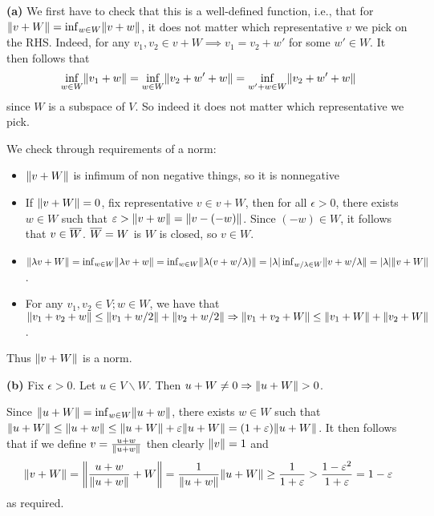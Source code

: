 \documentclass[a4paper, 10pt]{article}
\begin{document}
\begin{solution}
    \textbf{(a)} We first have to check that this is a well-defined function, i.e., that for $\norm{v + W} = \inf_{w \in W} \norm{v + w}$, it does not matter which representative $v$ we pick on the RHS. Indeed, for any $v_1, v_2 \in v + W \implies v_1 = v_2 + w'$ for some $w' \in W$. It then follows that \begin{equation*}
    \inf_{w \in W} \norm{v_1 + w} = \inf_{w \in W} \norm{v_2 + w' + w} = \inf_{w' + w \in W} \norm{v_2 + w' + w}
    \end{equation*}
    since $W$ is a subspace of $V$. So indeed it does not matter which representative we pick.


    We check through requirements of a norm:
    \begin{itemize}
        \item $\norm{v + W}$ is infimum of non negative things, so it is nonnegative
        \item If $\norm{v + W} = 0$, fix representative $v \in v + W$, then for all $\epsilon > 0$, there exists $w \in W$ such that $\epsilon > \norm{v + w} = \norm{v - (-w)}$. Since $(-w) \in W$, it follows that $v \in \cl{W}$. $\cl{W} = W$ is $W$ is closed, so $v \in W$.
        \item $\norm{\lambda v + W} = \inf_{w \in W} \norm{\lambda v + w} = \inf_{w \in W} \norm{\lambda(v + w/\lambda)} = \abs{\lambda} \inf_{w/\lambda \in W} \norm{v + w/\lambda} = \abs{\lambda} \norm{v + W}$.
        \item For any $v_1, v_2 \in V; w \in W$, we have that  $\norm{v_1 + v_2+ w} \leq \norm{v_1 + w/2} + \norm{v_2 + w/2} \implies \norm{v_1 + v_2 + W} \leq \norm{v_1 + W} + \norm{v_2 + W}$.
    \end{itemize}
    Thus $\norm{v + W}$ is a norm.

    \textbf{(b)} Fix $\epsilon > 0$. Let $u \in V \backslash W$. Then $u + W \neq 0 \implies \norm{u + W} > 0$.

    Since $\norm{u + W} = \inf_{w \in W} \norm{u + w}$, there exists $w \in W$ such that $\norm{u + W} \leq \norm{u + w} \leq \norm{u + W} + \epsilon \norm{u + W} = (1 + \epsilon) \norm{u + W}$. It then follows that if we define $v = \frac{u+w}{\norm{u+w}}$ then clearly $\norm{v} = 1$ and \begin{equation*}
    \norm{v + W} = \norm*{\frac{u + w}{\norm{u + w}} + W} = \frac{1}{\norm{u + w}}\norm{u + W} \geq \frac{1}{1 + \epsilon} > \frac{1-\epsilon^2}{1 + \epsilon} = 1 - \epsilon
    \end{equation*}
    as required.
\end{solution}
\end{document}
